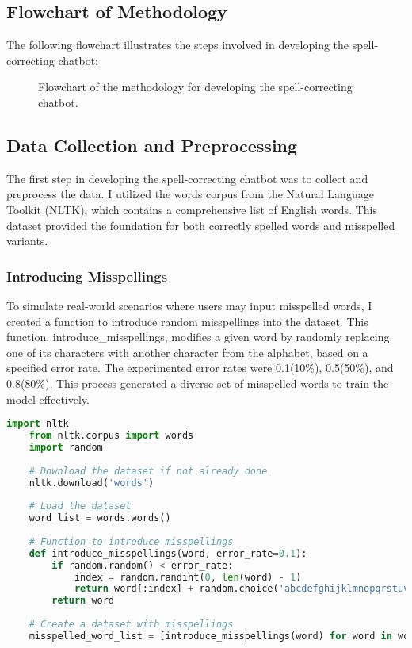 
\subsection{Flowchart of Methodology}
The following flowchart illustrates the steps involved in developing the spell-correcting chatbot:
\begin{figure}[h!]
    \centering
    
    \caption{Flowchart of the methodology for developing the spell-correcting chatbot.}
    \label{fig:flowchart}
\end{figure}

\subsection{Data Collection and Preprocessing}
The first step in developing the spell-correcting chatbot was to collect and preprocess the data. I utilized the words corpus from the Natural Language Toolkit (NLTK), which contains a comprehensive list of English words. This dataset provided the foundation for both correctly spelled words and misspelled variants.

\subsubsection{Introducing Misspellings}
To simulate real-world scenarios where users may input misspelled words, I created a function to introduce random misspellings into the dataset. This function, introduce_misspellings, modifies a given word by randomly replacing one of its characters with another character from the alphabet, based on a specified error rate. The experimented error rates were 0.1(10\%), 0.5(50\%), and 0.8(80\%). This process generated a diverse set of misspelled words to train the model effectively.
\begin{lstlisting}[language=Python, caption=Data Collection and Preprocessing]
    import nltk
    from nltk.corpus import words
    import random
    
    # Download the dataset if not already done
    nltk.download('words')
    
    # Load the dataset
    word_list = words.words()
    
    # Function to introduce misspellings
    def introduce_misspellings(word, error_rate=0.1):
        if random.random() < error_rate:
            index = random.randint(0, len(word) - 1)
            return word[:index] + random.choice('abcdefghijklmnopqrstuvwxyz') + word[index + 1:]
        return word
    
    # Create a dataset with misspellings
    misspelled_word_list = [introduce_misspellings(word) for word in word_list]
    
\end{lstlisting}

